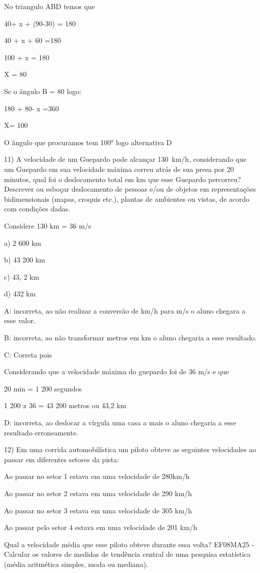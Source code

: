 No triangulo ABD temos que

40+ x + (90-30) = 180

40 + x + 60 =180

100 + x = 180

X = 80

Se o ângulo B = 80 logo:

180 + 80- x =360

X= 100

O ângulo que procuramos tem 100° logo alternativa D

11) A velocidade de um Guepardo pode alcançar 130~km/h, considerando que
um Guepardo em sua velocidade máxima correu atrás de sua presa por 20
minutos, qual foi o deslocamento total em km que esse Guepardo
percorreu? Descrever ou esboçar deslocamento de pessoas e/ou de objetos
em representações bidimensionais (mapas, croquis etc.), plantas de
ambientes ou vistas, de acordo com condições dadas.

Considere 130 km = 36 m/s

a) 2 600 km

b) 43 200 km

c) 43, 2 km

d) 432 km

A: incorreta, ao não realizar a conversão de km/h para m/s o aluno
chegara a esse valor.

B: incorreta, ao não transformar metros em km o aluno chegaria a esse
resultado.

C: Correta pois

Considerando que a velocidade máxima do guepardo foi de 36 m/s e que

20 min = 1 200 segundos

1 200 x 36 = 43 200 metros ou 43,2 km

D: incorreta, ao deslocar a vírgula uma casa a mais o aluno chegaria a
esse resultado erroneamente.

12) Em uma corrida automobilística um piloto obteve as seguintes
velocidades ao passar em diferentes setores da pista:

Ao passar no setor 1 estava em uma velocidade de 280km/h

Ao passar no setor 2 estava em uma velocidade de 290 km/h

Ao passar no setor 3 estava em uma velocidade de 305 km/h

Ao passar pelo setor 4 estava em uma velocidade de 201 km/h

Qual a velocidade média que esse piloto obteve durante essa volta?
EF08MA25 - Calcular os valores de medidas de tendência central de uma
pesquisa estatística (média aritmética simples, moda ou mediana).

